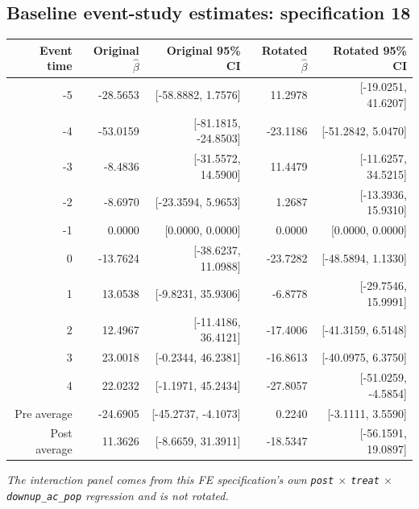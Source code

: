 \documentclass[10pt]{article}
\begin{document}
\subsection*{Baseline event-study estimates: specification 18}
\begin{center}
\scriptsize
\begin{tabular}{r rr rr}
\toprule
Event time & Original $\hat\beta$ & Original 95\% CI & Rotated $\hat\beta$ & Rotated 95\% CI \\
\midrule
-5 & -28.5653 & [-58.8882, 1.7576] & 11.2978 & [-19.0251, 41.6207] \\
-4 & -53.0159 & [-81.1815, -24.8503] & -23.1186 & [-51.2842, 5.0470] \\
-3 & -8.4836 & [-31.5572, 14.5900] & 11.4479 & [-11.6257, 34.5215] \\
-2 & -8.6970 & [-23.3594, 5.9653] & 1.2687 & [-13.3936, 15.9310] \\
-1 & 0.0000 & [0.0000, 0.0000] & 0.0000 & [0.0000, 0.0000] \\
0 & -13.7624 & [-38.6237, 11.0988] & -23.7282 & [-48.5894, 1.1330] \\
1 & 13.0538 & [-9.8231, 35.9306] & -6.8778 & [-29.7546, 15.9991] \\
2 & 12.4967 & [-11.4186, 36.4121] & -17.4006 & [-41.3159, 6.5148] \\
3 & 23.0018 & [-0.2344, 46.2381] & -16.8613 & [-40.0975, 6.3750] \\
4 & 22.0232 & [-1.1971, 45.2434] & -27.8057 & [-51.0259, -4.5854] \\
\midrule
Pre average & -24.6905 & [-45.2737, -4.1073] & 0.2240 & [-3.1111, 3.5590] \\
Post average & 11.3626 & [-8.6659, 31.3911] & -18.5347 & [-56.1591, 19.0897] \\
\bottomrule
\end{tabular}
\end{center}
\medskip
\textit{The interaction panel comes from this FE specification's own \texttt{post} $\times$ \texttt{treat} $\times$ \texttt{downup\_ac\_pop} regression and is not rotated.}
\clearpage
\end{document}
